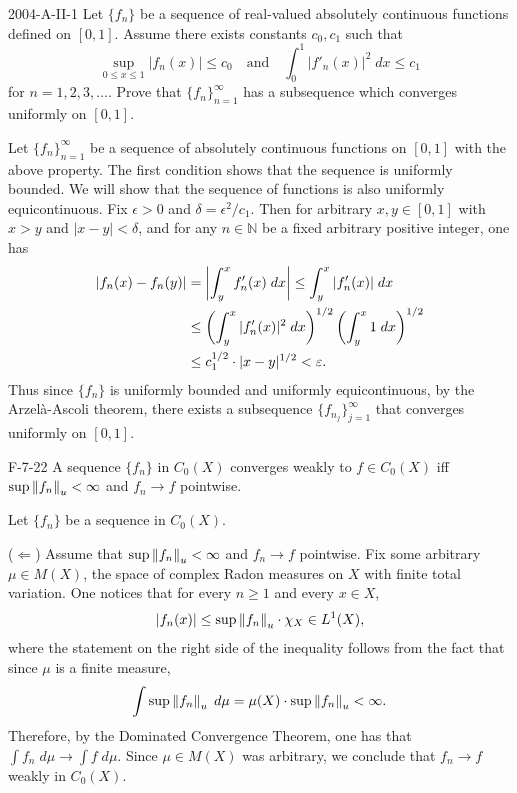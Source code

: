 \documentclass{article}
\begin{document}
	\begin{prb}{2004-A-II-1}
		Let $\{f_{n}\}$ be a sequence of real-valued absolutely continuous functions defined on $[0,1]$. Assume there exists constants $c_0, c_1$ such that 
		\begin{equation*}
			\sup_{0 \leq x \leq 1}|f_n(x)| \leq c_0 \quad \text{and} \quad \int_{0}^{1}|f'_n(x)|^2\;dx \leq c_1
		\end{equation*}
		for $n = 1, 2, 3,\ldots$. Prove that $\{f_n\}_{n=1}^\infty$ has a subsequence which converges uniformly on $[0,1]$. 
	\end{prb}
	Let $\{f_{n}\}_{n=1}^\infty$ be a sequence of absolutely continuous functions on $[0,1]$ with the above property. The first condition shows that the sequence is uniformly bounded. We will show that the sequence of functions is also uniformly equicontinuous. Fix $\epsilon > 0$ and $\delta = \epsilon^{2}/c_1$. Then for arbitrary $x, y \in [0,1]$ with $x > y$ and $|x - y| <\delta$, and for any $n \in \mathbb{N}$ be a fixed arbitrary positive integer, one has
	\begin{align*}
		\begin{split}
			|f_n(x) - f_n(y)| &= \left| \int_{y}^{x}f'_{n}(x)\;dx \right| \leq \int_{y}^{x}|f'_{n}(x)|\;dx  \\
			&\leq  \left(\int_{y}^{x}|f'_n(x)|^2\;dx\right)^{1/2} \left(\int_{y}^{x}1\;dx\right)^{1/2} \\
			&\leq c_{1}^{1/2}\cdot |x - y|^{1/2} < \varepsilon.  
		\end{split}
	\end{align*}
	Thus since $\{f_{n}\}$ is uniformly bounded and uniformly equicontinuous, by the Arzel\`a-Ascoli theorem, there exists a subsequence $\{f_{n_{j}}\}_{j= 1}^{\infty}$ that converges uniformly on $[0,1]$. 
	
	\begin{prb}{F-7-22}
		A sequence $\{f_{n}\}$ in $C_{0}(X)$ converges weakly to $f \in C_{0}(X)$ iff $\sup\left\Vert f_{n} \right\Vert_{u} < \infty$ and $f_{n} \to f$ pointwise.  
	\end{prb}
	Let $\{f_{n}\}$ be a sequence in $C_{0}(X)$. 
	
	($\Longleftarrow$) Assume that $\sup\left\Vert f_{n} \right\Vert_{u} < \infty$ and $f_{n} \to f$ pointwise. Fix some arbitrary $\mu \in M(X)$, the space of complex Radon measures on $X$ with finite total variation. One notices that for every $n \geq 1$ and every $x \in X$, 
	\begin{equation*}
		|f_{n}(x)| \leq \sup\left\Vert f_{n} \right\Vert_{u} \cdot \chi_{X} \in L^{1}(X), 
	\end{equation*}
	where the statement on the right side of the inequality follows from the fact that since $\mu$ is a finite measure, 
	\begin{equation*}
		\int \sup\left\Vert f_{n} \right\Vert_{u}\;d\mu = \mu(X) \cdot \sup\left\Vert f_{n} \right\Vert_{u} < \infty. 
	\end{equation*}
	Therefore, by the Dominated Convergence Theorem, one has that $\int f_{n}\;d\mu \to \int f\;d\mu$. Since $\mu \in M(X)$ was arbitrary, we conclude that $f_{n} \to f$ weakly in $C_{0}(X)$. 
	
\end{document}
